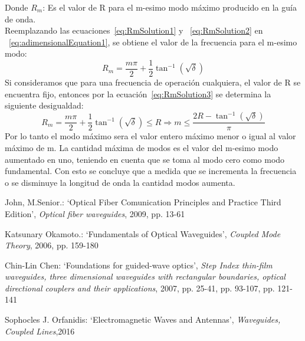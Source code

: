 \documentclass[letterpaper, 10 pt, conference]{ieeeconf}  %
\begin{document}
Donde \(R_m\): Es el valor de R para el m-esimo modo m\'aximo producido en la gu\'ia de onda.
\\
Reemplazando las ecuaciones~\eqref{eq:RmSolution1} y ~\eqref{eq:RmSolution2} en ~\eqref{eq:adimensionalEquation1}, se obtiene el valor de la frecuencia para el m-esimo modo:
\begin{equation}
\label{eq:RmSolution3}
{R_m} = \frac{{m\pi }}{2} + \frac{1}{2}{\tan ^{ - 1}}(\sqrt \delta  )
\end{equation}
Si consideramos que para una frecuencia de operaci\'on cualquiera, el valor de R se encuentra fijo, entonces por la ecuaci\'on~\eqref{eq:RmSolution3} se determina la siguiente desigualdad:
\begin{equation}
\label{eq:RmInequalitySolution}
{R_m} = \frac{{m\pi }}{2} + \frac{1}{2}{\tan ^{ - 1}}(\sqrt \delta  ) \le R \Rightarrow m \le \frac{{2R - {{\tan }^{ - 1}}(\sqrt \delta  )}}{\pi }
\end{equation}
Por lo tanto el modo m\'aximo sera el valor entero m\'aximo menor o igual al valor m\'aximo de m. La cantidad m\'axima de modos es el valor del m-esimo modo aumentado en uno, teniendo en cuenta que se toma al modo cero como modo fundamental.
Con esto se concluye que a medida que se incrementa la frecuencia o se disminuye la longitud de onda la cantidad modos aumenta.
\begin{thebibliography}{}

John, M.Senior.: `Optical Fiber Comunication Principles and Practice Third Edition',
\textit{Optical fiber waveguides}, 2009, pp. 13-61

Katsunary Okamoto.: `Fundamentals of Optical Waveguides',
\textit{Coupled Mode Theory}, 2006, pp. 159-180

Chin-Lin Chen: `Foundations for guided-wave optics',
\textit{Step Index thin-film waveguides, three dimensional waveguides with rectangular boundaries, optical directional couplers and their applications}, 2007, pp. 25-41, pp. 93-107, pp. 121-141

Sophocles J. Orfanidis: `Electromagnetic
Waves and Antennas',
\textit{Waveguides, Coupled Lines},2016
\end{thebibliography}
\end{document}
